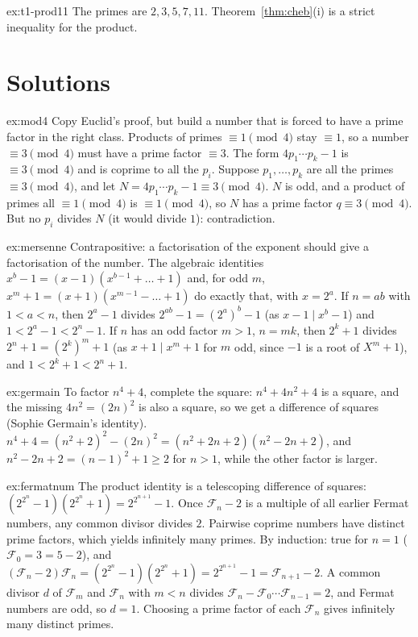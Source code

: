 \begin{hint}{ex:t1-prod11}
The primes are $2,3,5,7,11$. Theorem~\ref{thm:cheb}(i) is a strict inequality for the product.
\end{hint}

\section{Solutions}

\begin{solution}{ex:mod4}
\idea Copy Euclid's proof, but build a number that is forced to have a prime factor in the right class. Products of primes $\equiv1\pmod4$ stay $\equiv1$, so a number $\equiv3\pmod4$ must have a prime factor $\equiv3$. The form $4p_1\cdots p_k-1$ is $\equiv3\pmod4$ and is coprime to all the $p_i$.
\writeup Suppose $p_1,\dots,p_k$ are all the primes $\equiv3\pmod4$, and let $N=4p_1\cdots p_k-1\equiv3\pmod4$. $N$ is odd, and a product of primes all $\equiv1\pmod4$ is $\equiv1\pmod4$, so $N$ has a prime factor $q\equiv3\pmod4$. But no $p_i$ divides $N$ (it would divide $1$): contradiction.
\end{solution}

\begin{solution}{ex:mersenne}
\idea Contrapositive: a factorisation of the exponent should give a factorisation of the number. The algebraic identities $x^b-1=(x-1)(x^{b-1}+\dots+1)$ and, for odd $m$, $x^m+1=(x+1)(x^{m-1}-\dots+1)$ do exactly that, with $x=2^a$.
\writeup If $n=ab$ with $1<a<n$, then $2^a-1$ divides $2^{ab}-1=(2^a)^b-1$ (as $x-1\mid x^b-1$) and $1<2^a-1<2^n-1$. If $n$ has an odd factor $m>1$, $n=mk$, then $2^k+1$ divides $2^n+1=(2^k)^m+1$ (as $x+1\mid x^m+1$ for $m$ odd, since $-1$ is a root of $X^m+1$), and $1<2^k+1<2^n+1$.
\end{solution}

\begin{solution}{ex:germain}
\idea To factor $n^4+4$, complete the square: $n^4+4n^2+4$ is a square, and the missing $4n^2=(2n)^2$ is also a square, so we get a difference of squares (Sophie Germain's identity).
\writeup $n^4+4=(n^2+2)^2-(2n)^2=(n^2+2n+2)(n^2-2n+2)$, and $n^2-2n+2=(n-1)^2+1\ge2$ for $n>1$, while the other factor is larger.
\end{solution}

\begin{solution}{ex:fermatnum}
\idea The product identity is a telescoping difference of squares: $(2^{2^n}-1)(2^{2^n}+1)=2^{2^{n+1}}-1$. Once $\mathcal F_n-2$ is a multiple of all earlier Fermat numbers, any common divisor divides $2$. Pairwise coprime numbers have distinct prime factors, which yields infinitely many primes.
\writeup By induction: true for $n=1$ ($\mathcal F_0=3=5-2$), and $\left(\mathcal F_n-2\right)\mathcal F_n=\left(2^{2^n}-1\right)\left(2^{2^n}+1\right)=2^{2^{n+1}}-1=\mathcal F_{n+1}-2$. A common divisor $d$ of $\mathcal F_m$ and $\mathcal F_n$ with $m<n$ divides $\mathcal F_n-\mathcal F_0\cdots\mathcal F_{n-1}=2$, and Fermat numbers are odd, so $d=1$. Choosing a prime factor of each $\mathcal F_n$ gives infinitely many distinct primes.
\end{solution}

